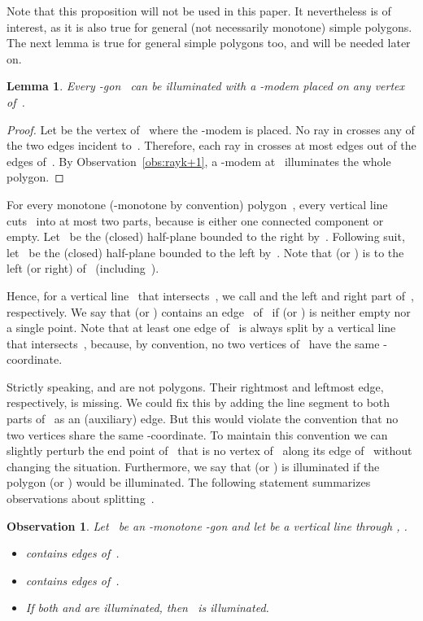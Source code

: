 \documentclass[A4]{article}
\newtheorem{lemma}[theorem]{Lemma}
\newtheorem{observation}[theorem]{Observation}
\begin{document}
Note that this proposition will not be used in this paper.
It nevertheless is of interest, as it is also true for general (not necessarily monotone) simple polygons.
The next lemma is true for general simple polygons too, and will be needed later on.

\begin{lemma}\label{lem:vertex}
Every -gon~ can be illuminated with a \mbox{-modem} placed on any vertex of~.
\end{lemma}
\begin{proof}
  Let  be the vertex of~ where the \mbox{-modem} is placed.
  No ray in  crosses any of the two edges incident to~.
Therefore, each ray in  crosses at most  edges out of the  edges of~.
By Observation~\ref{obs:rayk+1}, a \mbox{-modem} at~ illuminates the whole polygon. \end{proof}

For every monotone (-monotone by convention) polygon~, every vertical line~ cuts~ into at most two parts, because  is either one connected component or empty.
Let~ be the (closed) half-plane bounded to the right by~.
Following suit, let~ be the (closed) half-plane bounded to the left by~.
Note that  (or ) is to the left (or right) of~ (including~).

Hence, for a vertical line~ that intersects~, we call  and  the left and right part of~, respectively.
We say that  (or ) contains an edge~ of~ if  (or ) is neither empty nor a single point.
Note that at least one edge of~ is always split by a vertical line that intersects~, because, by convention, no two vertices of~ have the same -coordinate.

Strictly speaking,  and  are not polygons.
Their rightmost and leftmost edge, respectively, is missing.
We could fix this by adding the line segment  to both parts of~ as an (auxiliary) edge.
But this would violate the convention that no two vertices share the same -coordinate.
To maintain this convention we can slightly perturb the end point of~ that is no vertex of~ along its edge of~ without changing the situation.
Furthermore, we say that  (or ) is illuminated if the polygon  (or ) would be illuminated.
The following statement summarizes observations about splitting~. 

\begin{observation}\label{obs:simplesplit}
Let~ be an -monotone -gon and let  be a vertical line through , .
\begin{itemize}\vspace*{-0.5ex}
\item  contains  edges of~.
\item  contains  edges of~.
\item If both  and  are illuminated, then~ is illuminated.
\end{itemize}
\end{observation}
\end{document}
